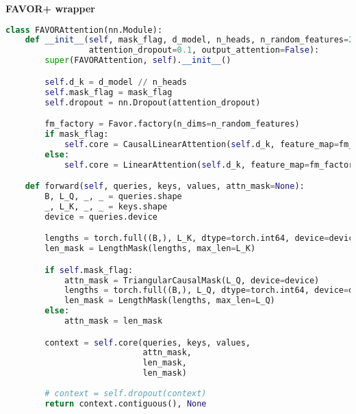 {\noindent\hspace{-12.5pt}\normalsize\bfseries FAVOR+ wrapper}\vspace{-10pt}
\begin{center}
  \begin{lstlisting}[language=Python,
  caption={Реализация механизма линейного внимания FAVOR+ на основе библиотеки fast\_transformers.},  
  label={lst:favor}]
class FAVORAttention(nn.Module):
    def __init__(self, mask_flag, d_model, n_heads, n_random_features=256, 
                 attention_dropout=0.1, output_attention=False):
        super(FAVORAttention, self).__init__()

        self.d_k = d_model // n_heads
        self.mask_flag = mask_flag
        self.dropout = nn.Dropout(attention_dropout)

        fm_factory = Favor.factory(n_dims=n_random_features)
        if mask_flag:
            self.core = CausalLinearAttention(self.d_k, feature_map=fm_factory)
        else:
            self.core = LinearAttention(self.d_k, feature_map=fm_factory)

    def forward(self, queries, keys, values, attn_mask=None):
        B, L_Q, _, _ = queries.shape
        _, L_K, _, _ = keys.shape
        device = queries.device

        lengths = torch.full((B,), L_K, dtype=torch.int64, device=device)
        len_mask = LengthMask(lengths, max_len=L_K)

        if self.mask_flag:
            attn_mask = TriangularCausalMask(L_Q, device=device)
            lengths = torch.full((B,), L_Q, dtype=torch.int64, device=device)
            len_mask = LengthMask(lengths, max_len=L_Q)
        else:
            attn_mask = len_mask

        context = self.core(queries, keys, values,
                            attn_mask,
                            len_mask,
                            len_mask)
        
        # context = self.dropout(context)
        return context.contiguous(), None
  \end{lstlisting}
\end{center}


